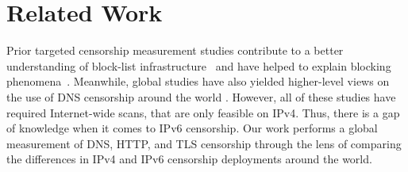 \section{Related Work}\label{sec:related}



Prior targeted censorship measurement studies contribute to a better understanding of
block-list infrastructure~\cite{ramesh2020decentralized, USESEC21:GFWatch} and
have helped to explain blocking phenomena~\cite{global2002great, Anonymous2020:TripletCensors}.
Meanwhile, global studies have also yielded higher-level views on the use of DNS censorship
around the world
\cite{vandersloot2018quack, scott2016satellite,
pearce2017global, sundara2020censored, niaki2020iclab}. However, all of these
studies have required Internet-wide scans, that are only feasible on IPv4. Thus,
there is a gap of knowledge when it comes to IPv6 censorship. Our work performs a
global measurement of DNS, HTTP, and TLS censorship through the lens of
comparing the
differences in IPv4 and IPv6 censorship deployments around the world.




